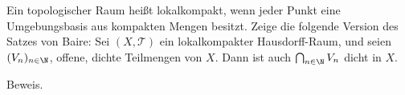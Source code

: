 \begin{exercise}
Ein topologischer Raum heißt lokalkompakt, wenn jeder Punkt eine Umgebungsbasis
aus kompakten Mengen besitzt. Zeige die folgende Version des Satzes von Baire:
Sei $(X,\mathcal{T})$ ein lokalkompakter Hausdorff-Raum, und seien $(V_n)_{n \in \N}$,
offene, dichte Teilmengen von $X$. Dann ist auch $\bigcap_{n \in \N} V_n$ dicht in $X$.
\end{exercise}
\begin{solution}
Beweis.
\end{solution}
